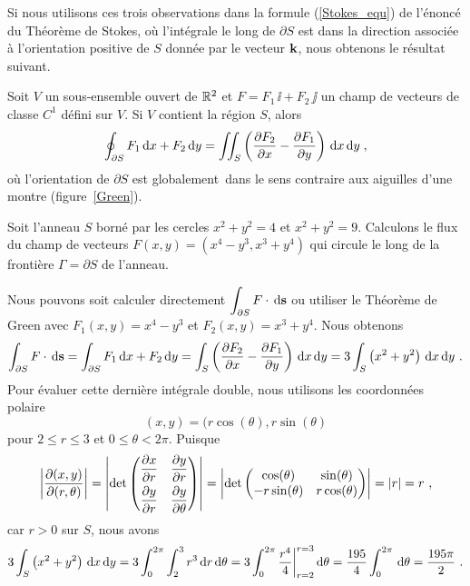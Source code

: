 {Si nous utilisons ces trois observations dans la formule
(\ref{Stokes_equ}) de l'énoncé du Théorème de Stokes, où 
l'intégrale le long de $\partial S$ est dans la direction associée à
l'orientation positive de $S$ donnée par le vecteur $\mathbf{k}$,
nous obtenons le résultat suivant.

\begin{theorem}
Soit $V$ un sous-ensemble ouvert de $\mathbb{R}^2$ et
$F=F_1\,\ii + F_2\,\jj$ un champ de vecteurs de classe $C^1$
défini sur $V$.  Si $V$ contient la région $S$, alors 
\begin{equation}\label{Green_th}
\oint_{\partial S} F_1 \,\mathrm{d}x + F_2 \,\mathrm{d}y = \iint_S \left(\frac{\partial F_2}{\partial x} -
  \frac{\partial F_1}{\partial y}\right)\,\mathrm{d}x\,\mathrm{d}y \; ,
\end{equation}
où l'orientation de $\partial S$ est \lgm globalement\rgm\ dans le
sens contraire aux aiguilles d'une montre (figure~\ref{Green}).
\end{theorem}


\begin{egg}
Soit l'anneau $S$ borné par les cercles $x^2+y^2 = 4$ et $x^2+y^2 = 9$.
Calculons le flux du champ de vecteurs
$F(x,y) = (x^4-y^3, x^3 + y^4)$ qui circule le long de la frontière
$\Gamma = \partial S$ de l'anneau.

Nous pouvons soit calculer directement
$\displaystyle \int_{\partial S} F \cdot \,\mathrm{d}\mathbf{s}$
ou utiliser le Théorème de Green avec $F_1(x,y) = x^4 - y^3$
et $F_2(x,y) = x^3 + y^4$.   Nous obtenons
\[
\int_{\partial S} F \cdot \,\mathrm{d}\mathbf{s}
= \int_{\partial S} F_1 \,\mathrm{d}x + F_2 \,\mathrm{d}y
= \int_S \left(\frac{\partial F_2}{\partial x} - \frac{\partial F_1}{\partial y} \right) \,\mathrm{d}x\,\mathrm{d}y
= 3 \int_S \left(x^2 + y^2 \right) \,\mathrm{d}x\,\mathrm{d}y \ .
\]
Pour évaluer cette dernière intégrale double, nous utilisons les
coordonnées polaire
\[
  (x,y) = (r\cos(\theta), r\sin(\theta)
\]
pour $2 \leq r \leq 3$ et $0 \leq \theta < 2 \pi$.  Puisque
\[
\left| \frac{\partial(x,y)}{\partial(r,\theta)} \right|
= \left| \det \begin{pmatrix} \displaystyle \frac{\partial x}{\partial r} &
\displaystyle \frac{\partial y}{\partial r} \\[0.7em]
\displaystyle \frac{\partial y}{\partial r} & \displaystyle \frac{\partial y}{\partial \theta}
\end{pmatrix} \right|
= \left| \det \begin{pmatrix} \cos(\theta) & \sin(\theta) \\
-r \sin(\theta) & r \cos(\theta) \end{pmatrix} \right|
= |r| = r \ ,
\]
car $r>0$ sur $S$, nous avons
\[
3 \int_S \left(x^2 + y^2 \right) \,\mathrm{d}x\,\mathrm{d}y
= 3 \int_0^{2\pi} \int_2^3 r^3 \,\mathrm{d}r\,\mathrm{d}\theta
= 3 \int_0^{2\pi} \frac{r^4}{4}\bigg|_{r=2}^{r=3} \,\mathrm{d}\theta
= \frac{195}{4} \int_0^{2\pi} \,\mathrm{d}\theta
= \frac{195\pi}{2} \ .
\]


\end{egg}}

